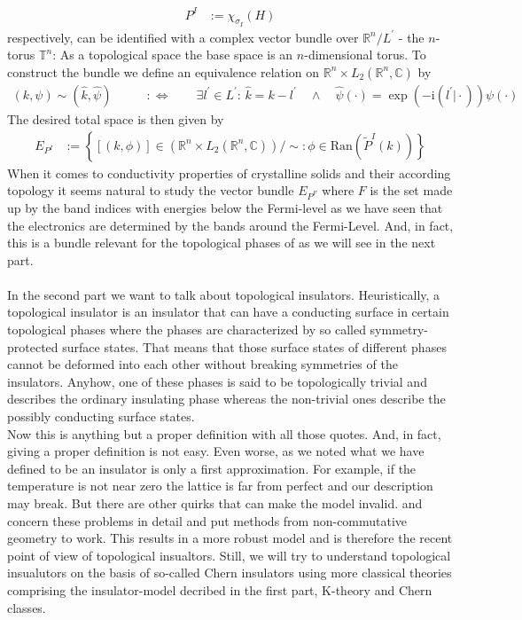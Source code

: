 \begin{align*}
  P^{I}
  &:=
  \chi_{\sigma_{I}}(H)
\end{align*}
respectively, can be identified with a complex vector bundle over $\mathbb{R}^{n}/L^{\prime}$ - the $n$-torus $\mathbb{T}^{n}$: As a topological space the base space is an $n$-dimensional torus. To construct the bundle we define an equivalence relation on $\mathbb{R}^{n} \times L_{2}(\mathbb{R}^{n},\mathbb{C})$ by
\begin{align*}
  (k,\psi)
  \sim
  (\hat{k},\hat{\psi})
  \qquad
  &:\Leftrightarrow
  \qquad
  \exists
  l^{\prime}
  \in
  L^{\prime}
  \colon
  \,
  \hat{k}
  =
  k
  -
  l^{\prime}
  \quad
  \land
  \quad
  \hat{\psi}(\cdot)
  =
  \exp(-\mathrm{i}(l^{\prime} \vert \cdot))
  \psi(\cdot)
\end{align*}
The desired total space is then given by
\begin{align*}
  E_{P^{I}}
  &:=
  \left\lbrace
      [(k,\phi)]
      \in
      \left(
        \mathbb{R}^{n}
        \times
        L_{2}(\mathbb{R}^{n},\mathbb{C})
      \right)
      /
      \sim
    \colon
      \phi
      \in
      \mathrm{Ran}(\tilde{P}^{I}(k))
  \right\rbrace
\end{align*}
When it comes to conductivity properties of crystalline solids and their according topology it seems natural to study the vector bundle $E_{P^{F}}$ where $F$ is the set made up by the band indices with energies below the Fermi-level as we have seen that the electronics are determined by the bands around the Fermi-Level. And, in fact, this is a bundle relevant for the topological phases of as we will see in the next part.
\\\\
In the second part we want to talk about topological insulators. Heuristically, a topological insulator is an insulator that can have a {\glqq}conducting{\grqq} surface in certain {\glqq}topological phases{\grqq} where the phases are characterized by so called symmetry-protected {\glqq}surface states{\grqq}. That means that those {\glqq}surface states{\grqq} of different phases cannot be {\glqq}deformed{\grqq} into each other without breaking symmetries of the insulators. Anyhow, one of these phases is said to be {\glqq}topologically trivial{\grqq} and describes the ordinary insulating phase whereas the {\glqq}non-trivial{\grqq} ones describe the possibly conducting surface states.
\\
Now this is anything but a proper definition with all those quotes. And, in fact, giving a proper definition is not easy. Even worse, as we noted what we have defined to be an insulator is only a first approximation. For example, if the temperature is not near zero the lattice is far from perfect and our description may break. But there are other quirks that can make the model invalid. \cite{5cb8b651} and \cite{f94459b0} concern these problems in detail and put methods from non-commutative geometry to work. This results in a more robust model and is therefore the recent point of view of topological insualtors. Still, we will try to understand topological insualutors on the basis of so-called Chern insulators using more classical theories comprising the insulator-model decribed in the first part, K-theory and Chern classes.
